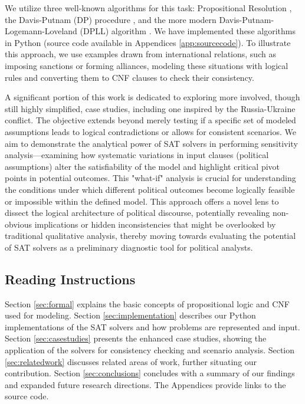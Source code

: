 \documentclass[11pt, a4paper]{article}
\begin{document}
We utilize three well-known algorithms for this task: Propositional Resolution \cite{Robinson1965}, the Davis-Putnam (DP) procedure \cite{DavisPutnam1960}, and the more modern Davis-Putnam-Logemann-Loveland (DPLL) algorithm \cite{DPLL1962}. We have implemented these algorithms in Python (source code available in Appendices \ref{app:sourcecode}). To illustrate this approach, we use examples drawn from international relations, such as imposing sanctions or forming alliances, modeling these situations with logical rules and converting them to CNF clauses to check their consistency.

A significant portion of this work is dedicated to exploring more involved, though still highly simplified, case studies, including one inspired by the Russia-Ukraine conflict. The objective extends beyond merely testing if a specific set of modeled assumptions leads to logical contradictions or allows for consistent scenarios. We aim to demonstrate the analytical power of SAT solvers in performing sensitivity analysis—examining how systematic variations in input clauses (political assumptions) alter the satisfiability of the model and highlight critical pivot points in potential outcomes. This "what-if" analysis is crucial for understanding the conditions under which different political outcomes become logically feasible or impossible within the defined model. This approach offers a novel lens to dissect the logical architecture of political discourse, potentially revealing non-obvious implications or hidden inconsistencies that might be overlooked by traditional qualitative analysis, thereby moving towards evaluating the potential of SAT solvers as a preliminary diagnostic tool for political analysts.

\subsection*{Reading Instructions}
Section \ref{sec:formal} explains the basic concepts of propositional logic and CNF used for modeling. Section \ref{sec:implementation} describes our Python implementations of the SAT solvers and how problems are represented and input. Section \ref{sec:casestudies} presents the enhanced case studies, showing the application of the solvers for consistency checking and scenario analysis. Section \ref{sec:relatedwork} discusses related areas of work, further situating our contribution. Section \ref{sec:conclusions} concludes with a summary of our findings and expanded future research directions. The Appendices provide links to the source code.
\end{document}
